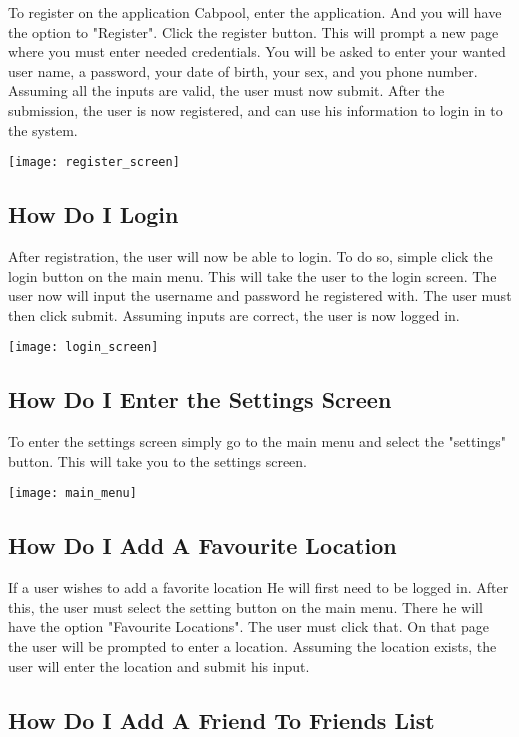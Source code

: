 \documentclass[english]{article}
\begin{document}
To register on the application Cabpool, enter the application. And you will have the option to "Register". Click the register button. This will prompt a new page where you must enter needed credentials. You will be asked to enter your wanted user name, a password, your date of birth, your sex, and you phone number. Assuming all the inputs are valid, the user must now submit. After the submission, the user is now registered, and can use his information to login in to the system. 

\texttt{[image: register\_screen]}

\subsection{How Do I Login}

After registration, the user will now be able to login. To do so, simple click the login button on the main menu. This will take the user to the login screen. The user now will input the username and password he registered with. The user must then click submit. Assuming inputs are correct, the user is now logged in.

\texttt{[image: login\_screen]}

\subsection{How Do I Enter the Settings Screen}

To enter the settings screen simply go to the main menu and select the "settings" button. This will take you to the settings screen. 

\texttt{[image: main\_menu]}


\subsection{How Do I Add A Favourite Location}

If a user wishes to add a favorite location He will first need to be logged in. After this, the user must select the setting button on the main menu. There he will have the option "Favourite Locations". The user must click that. On that page the user will be prompted to enter a location. Assuming the location exists, the user will enter the location and submit his input. 

\subsection{How Do I Add A Friend To Friends List}
\end{document}
